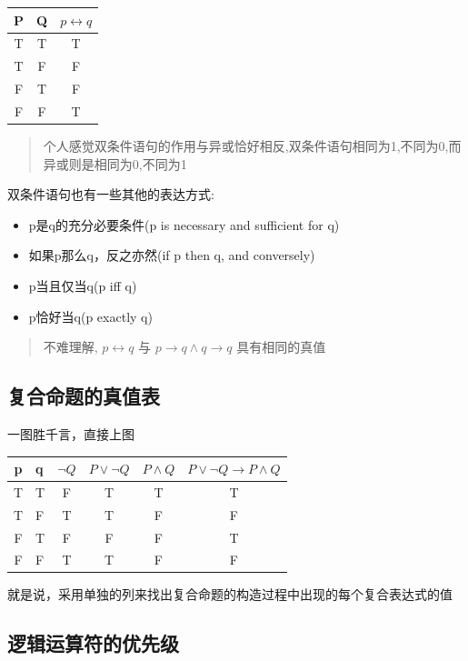 \documentclass[12pt,a4paper,oneside]{ctexart}
\begin{document}
\begin{tabular}{@{}ccc@{}}
\hline
P & Q & \(p \leftrightarrow q\) \\
\hline
T & T & T \\
T & F & F \\
F & T & F \\
F & F & T \\
\hline
\end{tabular}

\begin{quote}
个人感觉双条件语句的作用与异或恰好相反,双条件语句相同为1,不同为0,而异或则是相同为0,不同为1
\end{quote}

双条件语句也有一些其他的表达方式:

\begin{itemize}
\item
  p是q的充分必要条件(p is necessary and sufficient for q)
\item
  如果p那么q，反之亦然(if p then q, and conversely)
\item
  p当且仅当q(p iff q)
\item
  p恰好当q(p exactly q)
\end{itemize}

\begin{quote}
不难理解, \(p \leftrightarrow q\) 与 \(p\rightarrow q\wedge q\rightarrow q\) 具有相同的真值
\end{quote}

\subsection*{复合命题的真值表}

一图胜千言，直接上图

\begin{tabular}{@{}clcccc@{}}
\hline
p & q & \(\neg Q\) & \(P\vee \neg Q\) & \(P\wedge Q\) & \(P\vee \neg Q\rightarrow P\wedge Q\) \\
\hline
T & T & F & T & T & T \\
T & F & T & T & F & F \\
F & T & F & F & F & T \\
F & F & T & T & F & F \\
\hline
\end{tabular}

就是说，采用单独的列来找出复合命题的构造过程中出现的每个复合表达式的值

\subsection*{逻辑运算符的优先级}
\end{document}
